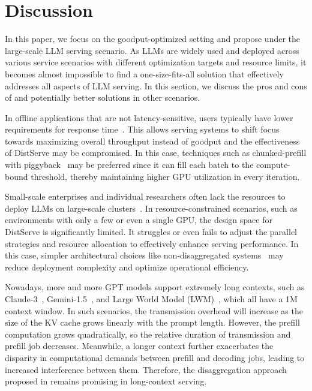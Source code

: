 \section{Discussion}
\label{sec:discussion}
In this paper, we focus on the goodput-optimized setting and propose \sys under the large-scale LLM serving scenario. As LLMs are widely used and deployed across various service scenarios with different optimization targets and resource limits, it becomes almost impossible to find a one-size-fits-all solution that effectively addresses all aspects of LLM serving. In this section, we discuss the pros and cons of \sys and potentially better solutions in other scenarios.

 In offline applications that are not latency-sensitive, users typically have lower requirements for response time~\cite{sheng2023flexgen}. This allows serving systems to shift focus towards maximizing overall throughput instead of goodput and the effectiveness of DistServe may be compromised. In this case, techniques such as chunked-prefill with piggyback~\cite{agrawal2023sarathi,deepspeed_mii} may be preferred since it can fill each batch to the compute-bound threshold, thereby maintaining higher GPU utilization in every iteration.

 Small-scale enterprises and individual researchers often lack the resources to deploy LLMs on large-scale clusters~\cite{sheng2023flexgen, song2023powerinfer}. In resource-constrained scenarios, such as environments with only a few or even a single GPU, the design space for DistServe is significantly limited. It struggles or even fails to adjust the parallel strategies and resource allocation to effectively enhance serving performance. In this case, simpler architectural choices like non-disaggregated systems~\cite{vllm, deepspeed_mii} may reduce deployment complexity and optimize operational efficiency.

 Nowadays, more and more GPT models support extremely long contexts, such as Claude-3~\cite{claude3}, Gemini-1.5~\cite{gemini}, and Large World Model (LWM)~\cite{liu2023world}, which all have a 1M context window. In such scenarios, the transmission overhead will increase as the size of the KV cache grows linearly with the prompt length. However, the prefill computation grows quadratically, so the relative duration of transmission and prefill job decreases. Meanwhile, a longer context further exacerbates the disparity in computational demands between prefill and decoding jobs, leading to increased interference between them. Therefore, the disaggregation approach proposed in \sys remains promising in long-context serving.